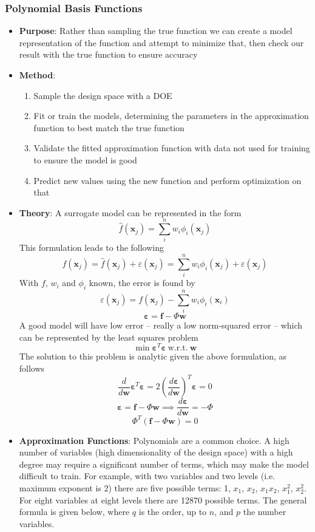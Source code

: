 \documentclass[11pt]{article}
\newcommand{\Item}[1]{\item \textbf{#1}:}
\newcommand{\CenteredBoxed}[1]{\begin{center}\boxed{#1}\end{center}}
\newcommand{\sumlim}[2]{\sum\limits_{#1}^{#2}}
\newcommand{\boldx}{\mathbf{x}}
\begin{document}
\subsubsection{Polynomial Basis Functions}
\begin{itemize}
\Item{Purpose} Rather than sampling the true function we can create a model representation of the function and attempt to minimize that, then check our result with the true function to ensure accuracy
\Item{Method}
	\begin{enumerate}
	\item Sample the design space with a DOE
	\item Fit or train the models, determining the parameters in the approximation function to best match the true function
	\item Validate the fitted approximation function with data not used for training to ensure the model is good
	\item Predict new values using the new function and perform optimization on that
	\end{enumerate}
\Item{Theory} A surrogate model can be represented in the form
$$\hat{f}(\boldx_j)=\sumlim{i}{n}w_i\phi_i(\boldx_j)$$
This formulation leads to the following
$$f(\boldx_j) = \hat{f}(\boldx_j) + \varepsilon(\boldx_j) = \sumlim{i}{n}w_i\phi_i(\boldx_j) + \varepsilon(\boldx_j)$$
With $f$, $w_i$ and $\phi_i$ known, the error is found by
$$\varepsilon(\boldx_j)=f(\boldx_j)-\sumlim{i}{n}w_i\phi_i(\boldx_i)$$
$$\bm{\varepsilon}=\bm{f}-\Phi\bm{w}$$
A good model will have low error -- really a low norm-squared error -- which can be represented by the least squares problem
$$\min\bm{\varepsilon}^T\bm{\varepsilon}\ \mathrm{w.r.t.}\ \bm{w}$$
The solution to this problem is analytic given the above formulation, as follows
$$\frac{d}{d\bm{w}}\bm{\varepsilon}^T\bm{\varepsilon} = 2\left(\frac{d\bm{\varepsilon}}{d\bm{w}}\right)^T\bm{\varepsilon}=0$$
$$\bm{\varepsilon}=\bm{f}-\Phi\bm{w}\implies \frac{d\bm{\varepsilon}}{d\bm{w}}=-\Phi$$
$$\Phi^T(\bm{f}-\Phi\bm{w})=0$$
\CenteredBoxed{\bm{w}=\left(\Phi^T\Phi\right)^{-1}\Phi^T\bm{f}}
\Item{Approximation Functions} Polynomials are a common choice. A high number of variables (high dimensionality of the design space) with a high degree may require a significant number of terms, which may make the model difficult to train. For example, with two variables and two levels (i.e. maximum exponent is 2) there are five possible terms: 1, $x_1$, $x_2$, $x_1x_2$, $x_1^2$, $x_2^2$. For eight variables at eight levels there are 12870 possible terms. The general formula is given below, where $q$ is the order, up to $n$, and $p$ the number variables.

\end{itemize}
\end{document}
